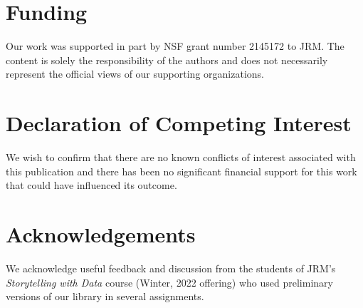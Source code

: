 \documentclass[preprint,12pt, a4paper]{elsarticle}
\begin{document}
\section*{Funding}
Our work was supported in part by NSF grant number 2145172 to JRM.
The content is solely the responsibility of the authors and does not necessarily represent the official views of our supporting organizations.


\section*{Declaration of Competing Interest}
We wish to confirm that there are no known conflicts of interest associated with this publication and there has been no significant financial support for this work that could have influenced its outcome.


\section*{Acknowledgements}
We acknowledge useful feedback and discussion from the students of
JRM's \textit{Storytelling with Data} course (Winter, 2022 offering)
who used preliminary versions of our library in several assignments.



\end{document}
